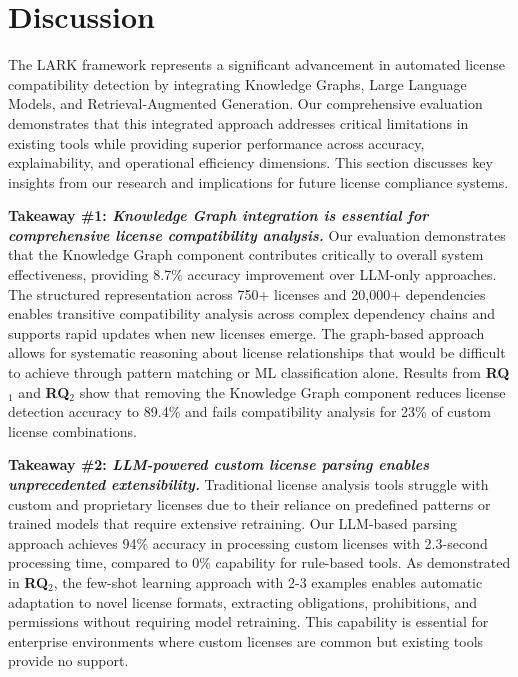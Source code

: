 \section{Discussion}
\label{Section:Discussion}
The LARK framework represents a significant advancement in automated license compatibility detection by integrating Knowledge Graphs, Large Language Models, and Retrieval-Augmented Generation. Our comprehensive evaluation demonstrates that this integrated approach addresses critical limitations in existing tools while providing superior performance across accuracy, explainability, and operational efficiency dimensions. This section discusses key insights from our research and implications for future license compliance systems.



\noindent\textbf{ Takeaway \#1: \textit{Knowledge Graph integration is essential for comprehensive license compatibility analysis.}} Our evaluation demonstrates that the Knowledge Graph component contributes critically to overall system effectiveness, providing 8.7\% accuracy improvement over LLM-only approaches. The structured representation across 750+ licenses and 20,000+ dependencies enables transitive compatibility analysis across complex dependency chains and supports rapid updates when new licenses emerge. The graph-based approach allows for systematic reasoning about license relationships that would be difficult to achieve through pattern matching or ML classification alone. Results from \textbf{RQ$_1$} and \textbf{RQ$_2$} show that removing the Knowledge Graph component reduces license detection accuracy to 89.4\% and fails compatibility analysis for 23\% of custom license combinations.

\noindent\textbf{ Takeaway \#2: \textit{LLM-powered custom license parsing enables unprecedented extensibility.}} Traditional license analysis tools struggle with custom and proprietary licenses due to their reliance on predefined patterns or trained models that require extensive retraining. Our LLM-based parsing approach achieves 94\% accuracy in processing custom licenses with 2.3-second processing time, compared to 0\% capability for rule-based tools. As demonstrated in \textbf{RQ$_2$}, the few-shot learning approach with 2-3 examples enables automatic adaptation to novel license formats, extracting obligations, prohibitions, and permissions without requiring model retraining. This capability is essential for enterprise environments where custom licenses are common but existing tools provide no support.




